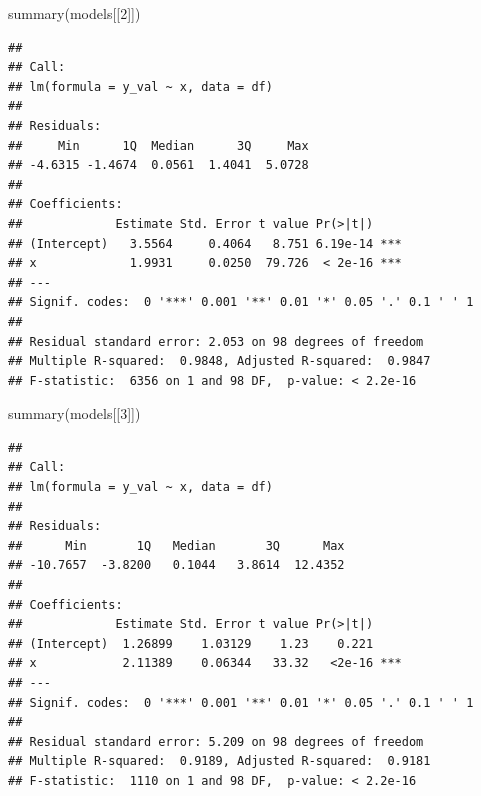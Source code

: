 \documentclass[
]{book}
\newenvironment{Shaded}{\begin{snugshade}}{\end{snugshade}}
\newcommand{\AttributeTok}[1]{\textcolor[rgb]{0.77,0.63,0.00}{#1}}
\newcommand{\ControlFlowTok}[1]{\textcolor[rgb]{0.13,0.29,0.53}{\textbf{#1}}}
\newcommand{\DecValTok}[1]{\textcolor[rgb]{0.00,0.00,0.81}{#1}}
\newcommand{\FunctionTok}[1]{\textcolor[rgb]{0.00,0.00,0.00}{#1}}
\newcommand{\NormalTok}[1]{#1}
\newcommand{\OtherTok}[1]{\textcolor[rgb]{0.56,0.35,0.01}{#1}}
\newcommand{\SpecialCharTok}[1]{\textcolor[rgb]{0.00,0.00,0.00}{#1}}
\begin{document}
\begin{Shaded}
\end{Shaded}

\begin{Shaded}
\begin{Highlighting}[]
\FunctionTok{summary}\NormalTok{(models[[}\DecValTok{2}\NormalTok{]])}
\end{Highlighting}
\end{Shaded}

\begin{verbatim}
## 
## Call:
## lm(formula = y_val ~ x, data = df)
## 
## Residuals:
##     Min      1Q  Median      3Q     Max 
## -4.6315 -1.4674  0.0561  1.4041  5.0728 
## 
## Coefficients:
##             Estimate Std. Error t value Pr(>|t|)    
## (Intercept)   3.5564     0.4064   8.751 6.19e-14 ***
## x             1.9931     0.0250  79.726  < 2e-16 ***
## ---
## Signif. codes:  0 '***' 0.001 '**' 0.01 '*' 0.05 '.' 0.1 ' ' 1
## 
## Residual standard error: 2.053 on 98 degrees of freedom
## Multiple R-squared:  0.9848, Adjusted R-squared:  0.9847 
## F-statistic:  6356 on 1 and 98 DF,  p-value: < 2.2e-16
\end{verbatim}

\begin{Shaded}
\begin{Highlighting}[]
\FunctionTok{summary}\NormalTok{(models[[}\DecValTok{3}\NormalTok{]])}
\end{Highlighting}
\end{Shaded}

\begin{verbatim}
## 
## Call:
## lm(formula = y_val ~ x, data = df)
## 
## Residuals:
##      Min       1Q   Median       3Q      Max 
## -10.7657  -3.8200   0.1044   3.8614  12.4352 
## 
## Coefficients:
##             Estimate Std. Error t value Pr(>|t|)    
## (Intercept)  1.26899    1.03129    1.23    0.221    
## x            2.11389    0.06344   33.32   <2e-16 ***
## ---
## Signif. codes:  0 '***' 0.001 '**' 0.01 '*' 0.05 '.' 0.1 ' ' 1
## 
## Residual standard error: 5.209 on 98 degrees of freedom
## Multiple R-squared:  0.9189, Adjusted R-squared:  0.9181 
## F-statistic:  1110 on 1 and 98 DF,  p-value: < 2.2e-16
\end{verbatim}
\end{document}
